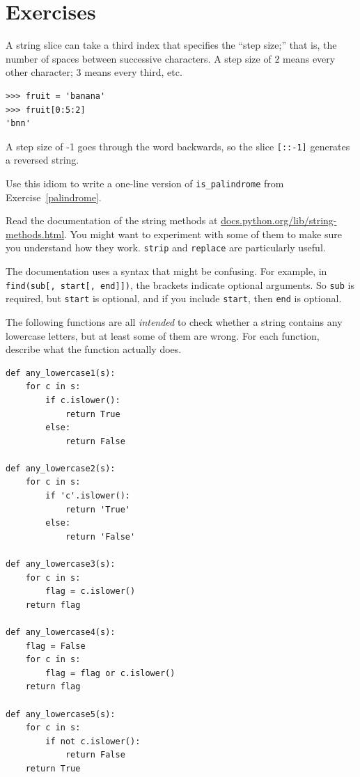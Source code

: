 \documentclass[10pt]{book}
\begin{document}
\section{Exercises}

\begin{ex}


A string slice can take a third index that specifies the ``step
size;'' that is, the number of spaces between successive characters.
A step size of 2 means every other character; 3 means every third,
etc.

\beforeverb
\begin{verbatim}
>>> fruit = 'banana'
>>> fruit[0:5:2]
'bnn'
\end{verbatim}
\afterverb

A step size of -1 goes through the word backwards, so
the slice \verb"[::-1]" generates a reversed string.


Use this idiom to write a one-line version of \verb"is_palindrome"
from Exercise~\ref{palindrome}.
\end{ex}


\begin{ex}

Read the documentation of the string methods at
\url{docs.python.org/lib/string-methods.html}.  You
might want to experiment with some of them to make sure
you understand how they work.  {\tt strip} and
{\tt replace} are particularly useful.

The documentation uses a syntax that might be confusing.
For example, in \verb"find(sub[, start[, end]])", the brackets
indicate optional arguments.  So {\tt sub} is required, but
{\tt start} is optional, and if you include {\tt start},
then {\tt end} is optional.
\end{ex}

\begin{ex}
The following functions are all {\em intended} to check whether a
string contains any lowercase letters, but at least some of them are
wrong.  For each function, describe what the function actually does.

\beforeverb
\begin{verbatim}
def any_lowercase1(s):
    for c in s:
        if c.islower():
            return True
        else:
            return False

def any_lowercase2(s):
    for c in s:
        if 'c'.islower():
            return 'True'
        else:
            return 'False'

def any_lowercase3(s):
    for c in s:
        flag = c.islower()
    return flag

def any_lowercase4(s):
    flag = False
    for c in s:
        flag = flag or c.islower()
    return flag

def any_lowercase5(s):
    for c in s:
        if not c.islower():
            return False
    return True
\end{verbatim}
\afterverb

\end{ex}
\end{document}
